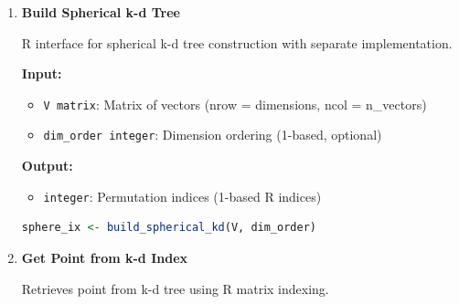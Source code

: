 \documentclass[11pt]{article}
\begin{document}
\begin{enumerate}
\begin{enumerate}
	      	      \textbf{Input:}
	      	      \begin{itemize}
	      	      	\item \texttt{X matrix}: Matrix of points (nrow = dimensions, ncol =
	      	      	      n\_points)
	      	      	      
	      	      	\item \texttt{dim\_order integer}: Dimension ordering (1-based, optional)
	      	      \end{itemize}
	      	      \textbf{Output:}
	      	      \begin{itemize}
	      	      	\item \texttt{integer}: Permutation indices (1-based R indices)
	      	      \end{itemize}
	      	      \begin{lstlisting}[language=R]
kd_ix <- build_kd_index(X, dim_order)
	      	      \end{lstlisting}
	      	      
	      	\item \textbf{Build Spherical k-d Tree}
	      	      
	      	      R interface for spherical k-d tree construction with separate implementation.
	      	      
	      	      \textbf{Input:}
	      	      \begin{itemize}
	      	      	\item \texttt{V matrix}: Matrix of vectors (nrow = dimensions, ncol =
	      	      	      n\_vectors)
	      	      	      
	      	      	\item \texttt{dim\_order integer}: Dimension ordering (1-based, optional)
	      	      \end{itemize}
	      	      \textbf{Output:}
	      	      \begin{itemize}
	      	      	\item \texttt{integer}: Permutation indices (1-based R indices)
	      	      \end{itemize}
	      	      \begin{lstlisting}[language=R]
sphere_ix <- build_spherical_kd(V, dim_order)
	      	      \end{lstlisting}
	      	      
	      	\item \textbf{Get Point from k-d Index}
	      	      
	      	      Retrieves point from k-d tree using R matrix indexing.
	      	      

\end{enumerate}
\end{enumerate}
\end{document}
